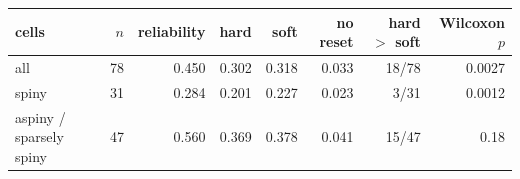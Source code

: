 \begin{tabular}{lrrrrrrr}
\toprule
cells & $n$ & reliability & hard & soft & no reset & hard $>$ soft & Wilcoxon $p$\\
\midrule
all & 78 & 0.450 & 0.302 & 0.318 & 0.033 & 18/78 & 0.0027\\
spiny & 31 & 0.284 & 0.201 & 0.227 & 0.023 & 3/31 & 0.0012\\
aspiny / sparsely spiny & 47 & 0.560 & 0.369 & 0.378 & 0.041 & 15/47 & 0.18\\
\bottomrule
\end{tabular}
